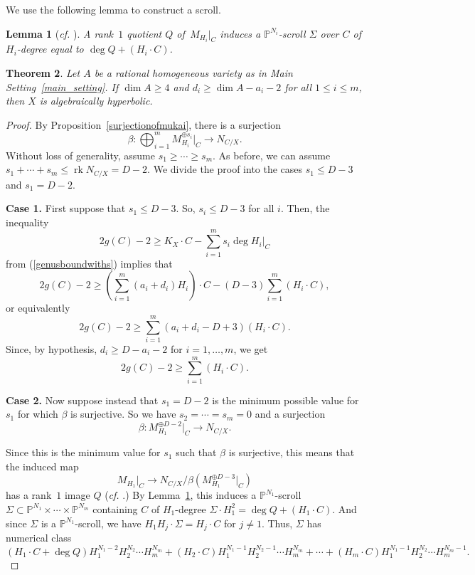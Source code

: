 \documentclass[10pt,a4paper]{article}
\numberwithin{equation}{section}
\newtheorem{theorem}{Theorem}[section]
\newtheorem{lemma}[theorem]{Lemma}
\theoremstyle{definition}
\theoremstyle{remark}
\renewcommand{\P}{\mathbb{P}}
\DeclareMathOperator{\rk}{rk}
\newcommand{\lra}{\longrightarrow}
\begin{document}
We use the following lemma to construct a scroll.

\begin{lemma}[\textit{cf.} {\cite[Lemma 2.13]{CR19}}]\label{scroll}
A rank~$1$ quotient $Q$ of\, $M_{H_i}|_C$ induces a $\P^{N_i}$-scroll $\Sigma$ over $C$ of\, $H_i$-degree equal to $\deg Q + (H_i\cdot C)$.
\end{lemma}

\begin{theorem}\label{scroll_method}
Let $A$ be a rational homogeneous variety as in Main Setting~\ref{main_setting}. If $\dim A\ge 4$ and $d_i\ge \dim A-a_i-2$ for all $1\le i\le m$, then $X$ is algebraically hyperbolic.
\end{theorem}
\begin{proof}
By Proposition~\ref{surjectionofmukai}, there is a surjection 
\[ \beta \colon \bigoplus_{i=1}^{m} M_{H_i}^{\oplus s_i}|_C\lra N_{C/X}. \]
Without loss of generality, assume $s_1\ge \cdots \ge s_m$. As before, we can assume $s_1 + \cdots + s_m\le \rk N_{C/X} = D - 2$. We divide the proof into the cases $s_1\le D - 3$ and $s_1 = D - 2$.

\textbf{Case 1.} First suppose that $s_1\le D - 3$. So, $s_i\le D-3$ for all $i$. Then, the inequality  
\[ 2g(C)-2\ge K_{X}\cdot C - \sum_{i=1}^{m} s_i\deg H_i|_{C} \]
from (\ref{genusboundwiths}) implies that
\[ 2g(C)-2\ge \left (\sum_{i=1}^m (a_i+d_i)H_i\right )\cdot C - (D-3)\sum_{i=1}^{m} (H_i\cdot C), \]
or equivalently
\[ 2g(C)-2\ge \sum_{i=1}^m (a_i+d_i - D + 3)(H_i\cdot C). \]
Since, by hypothesis, $d_i\ge D-a_i-2$ for $i=1, \hdots , m$, we get
\[ 2g(C)-2\ge \sum_{i=1}^m (H_i\cdot C). \]

\textbf{Case 2.} Now suppose  instead that $s_1 = D-2$ is the minimum possible value for $s_1$ for which $\beta$ is surjective. So we have $s_2=\cdots =s_m=0$ and a surjection
\[ \beta \colon M_{H_1}^{\oplus D-2}|_C \lra N_{C/X}. \]

Since this is the minimum value for $s_1$ such that $\beta$ is surjective, this means that the induced map
\begin{equation}\label{quot_map}
    M_{H_1}|_{C} \lra N_{C/X} / \beta \left (M_{H_1}^{\oplus D-3}|_C\right )
\end{equation}
has a rank~$1$ image $Q$ (\textit{cf.} \cite[Section 2.2]{Cl03}.) By Lemma~\ref{scroll}, this induces a $\P^{N_1}$-scroll $\Sigma \subset \P^{N_1}\times \cdots \times \P^{N_m}$ containing $C$ of $H_1$-degree $\Sigma \cdot H_1^2 = \deg Q + (H_1\cdot C)$. And since $\Sigma$ is a $\P^{N_1}$-scroll, we have $H_1H_j\cdot \Sigma = H_j\cdot C$ for $j\neq 1$. Thus, $\Sigma$ has numerical class
\[ (H_1\cdot C + \deg Q)H_1^{N_1-2}H_2^{N_2}\cdots H_m^{N_m} + (H_2\cdot C)H_1^{N_1-1}H_2^{N_2-1}\cdots H_m^{N_m} + \cdots + (H_m\cdot C)H_1^{N_1-1}H_2^{N_2}\cdots H_m^{N_m-1}. \]


\end{proof}
\end{document}

